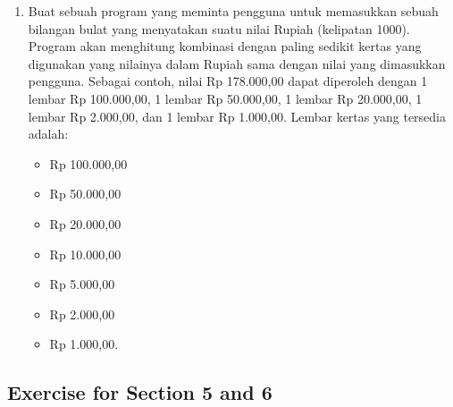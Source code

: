 \documentclass[14pt]{extarticle}
\begin{document}
\begin{enumerate}
	\item Buat sebuah program yang meminta pengguna untuk memasukkan sebuah bilangan bulat yang menyatakan suatu nilai Rupiah (kelipatan 1000). Program akan menghitung kombinasi dengan paling sedikit kertas yang digunakan yang nilainya dalam Rupiah sama dengan nilai yang dimasukkan pengguna. Sebagai contoh, nilai Rp 178.000,00 dapat diperoleh dengan 1 lembar Rp 100.000,00, 1 lembar Rp 50.000,00, 1 lembar Rp 20.000,00, 1 lembar Rp 2.000,00, dan 1 lembar Rp 1.000,00. Lembar kertas yang tersedia adalah:
	\begin{itemize}
		\item Rp 100.000,00
		\item Rp 50.000,00
		\item Rp 20.000,00
		\item Rp 10.000,00
		\item Rp 5.000,00
		\item Rp 2.000,00
		\item Rp 1.000,00.
	\end{itemize}
\end{enumerate}

\subsection{Exercise for Section 5 and 6}
\end{document}
